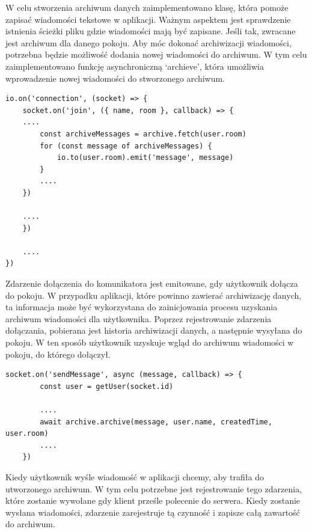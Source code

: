 W celu stworzenia archiwum danych zaimplementowano klasę, która pomoże zapisać wiadomości tekstowe w aplikacji. Ważnym aspektem jest sprawdzenie istnienia ścieżki pliku gdzie wiadomości mają być zapisane. Jeśli tak, zwracane jest archiwum dla danego pokoju. Aby móc dokonać archiwizacji wiadomości, potrzebna będzie możliwość dodania nowej wiadomości do archiwum. W tym celu zaimplementowano funkcję asynchroniczną ‘archieve’, która umożliwia wprowadzenie nowej wiadomości do stworzonego archiwum. 
\begin{lstlisting}[caption={Wykorzystanie zdarzenia dołączenia, aby uzyskać widok zawartości archiwum w aplikacji}]
io.on('connection', (socket) => {
    socket.on('join', ({ name, room }, callback) => {
	....
        const archiveMessages = archive.fetch(user.room)
        for (const message of archiveMessages) {
            io.to(user.room).emit('message', message)
        }
        ....
    })

   	....
    })

  	....
})
\end{lstlisting}
Zdarzenie dołączenia do komunikatora jest emitowane, gdy użytkownik dołącza do pokoju. W przypadku aplikacji, które powinno zawierać archiwizację danych, ta informacja może być wykorzystana do zainicjowania procesu uzyskania archiwum wiadomości dla użytkownika. Poprzez rejestrowanie zdarzenia dołączania, pobierana jest historia archiwizacji danych, a następnie wysyłana do pokoju. W ten sposób użytkownik uzyskuje wgląd do archiwum wiadomości w pokoju, do którego dołączył.
\begin{lstlisting}[caption=Wykorzystanie zdarzenia wysyłania wiadomości do tworzenia archiwum]
socket.on('sendMessage', async (message, callback) => {
        const user = getUser(socket.id)

      	....
        await archive.archive(message, user.name, createdTime, user.room)
       	....
    })
\end{lstlisting}

Kiedy użytkownik wyśle wiadomość w aplikacji chcemy, aby trafiła do utworzonego archiwum. W tym celu potrzebne jest rejestrowanie tego zdarzenia, które zostanie wywołane gdy klient prześle polecenie do serwera. Kiedy zostanie wysłana wiadomości, zdarzenie zarejestruje tą czynność i zapisze całą zawartość do archiwum. 




